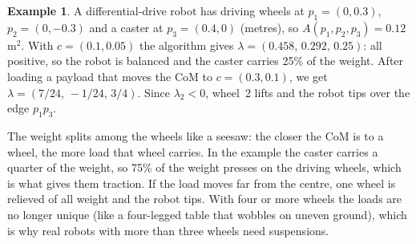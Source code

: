 \documentclass[11pt,a4paper]{article}
\theoremstyle{definition}
\newtheorem{example}[definition]{Example}
\newtheorem{algorithm}[definition]{Algorithm}
\theoremstyle{plain}
\newtheorem{corollary}[definition]{Corollary}
\begin{document}

\begin{example}
A differential-drive robot has driving wheels at $p_1=(0,0.3)$, $p_2=(0,-0.3)$ and a caster at $p_3=(0.4,0)$ (metres), so $A(p_1,p_2,p_3)=0.12$\,m$^2$. With $c=(0.1,0.05)$ the algorithm gives $\lambda=(0.458,\,0.292,\,0.25)$: all positive, so the robot is balanced and the caster carries 25\% of the weight. After loading a payload that moves the CoM to $c=(0.3,0.1)$, we get $\lambda=(7/24,\,-1/24,\,3/4)$. Since $\lambda_2<0$, wheel~2 lifts and the robot tips over the edge $p_1p_3$.
\end{example}


\begin{intuition}
The weight splits among the wheels like a seesaw: the closer the CoM is to a wheel, the more load that wheel carries. In the example the caster carries a quarter of the weight, so 75\% of the weight presses on the driving wheels, which is what gives them traction. If the load moves far from the centre, one wheel is relieved of all weight and the robot tips. With four or more wheels the loads are no longer unique (like a four-legged table that wobbles on uneven ground), which is why real robots with more than three wheels need suspensions.
\end{intuition}
\end{document}
